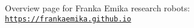

Overview page for Franka Emika research robots\+: \href{https://frankaemika.github.io}{\tt https\+://frankaemika.\+github.\+io} 